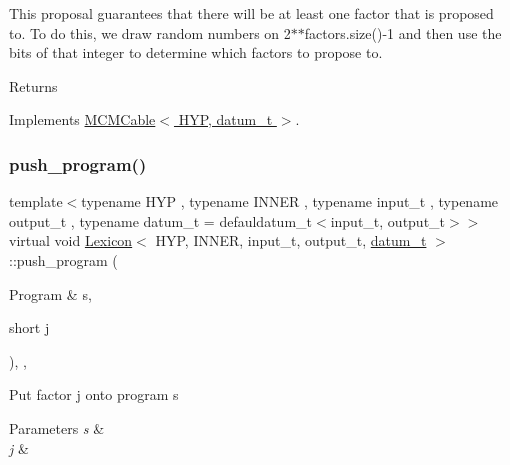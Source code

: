 This proposal guarantees that there will be at least one factor that is proposed to. To do this, we draw random numbers on 2$\ast$$\ast$factors.size()-\/1 and then use the bits of that integer to determine which factors to propose to. \begin{DoxyReturn}{Returns}

\end{DoxyReturn}


Implements \hyperlink{class_m_c_m_cable_ab119a14256ab92c5c1e941f8492df830}{M\+C\+M\+Cable$<$ H\+Y\+P, datum\+\_\+t $>$}.

\mbox{\label{class_lexicon_acd367c70ccc583f2a9fcbb1d007db45c}} 
\subsubsection{\texorpdfstring{push\+\_\+program()}{push\_program()}}
{\footnotesize\ttfamily template$<$typename H\+YP , typename I\+N\+N\+ER , typename input\+\_\+t , typename output\+\_\+t , typename datum\+\_\+t  = defauldatum\+\_\+t$<$input\+\_\+t, output\+\_\+t$>$$>$ \\
virtual void \hyperlink{class_lexicon}{Lexicon}$<$ H\+YP, I\+N\+N\+ER, input\+\_\+t, output\+\_\+t, \hyperlink{class_bayesable_a9f1a6c0cd7855550fa10b1a8f13a5867}{datum\+\_\+t} $>$\+::push\+\_\+program (\begin{DoxyParamCaption}\item[{Program \&}]{s,  }\item[{short}]{j }\end{DoxyParamCaption})\hspace{0.3cm}{\ttfamily [inline]}, {\ttfamily [override]}, {\ttfamily [virtual]}}

Put factor j onto program s 
\begin{DoxyParams}{Parameters}
{\em s} & \\
\hline
{\em j} & \\
\hline
\end{DoxyParams}
\mbox{\label{class_lexicon_ac8577ba9b4554ebf1852020c617bd7df}} 
